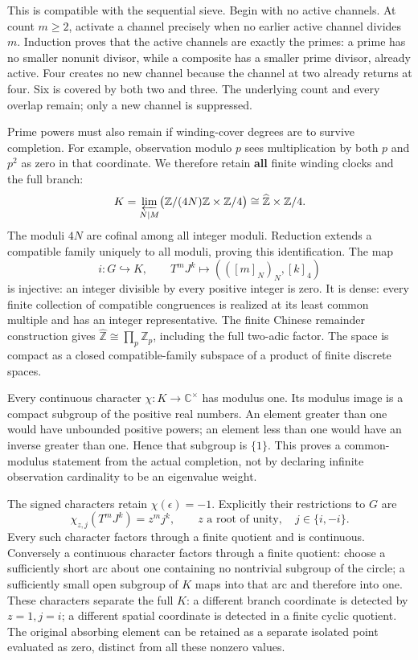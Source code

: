 \documentclass[
]{article}
\begin{document}
This is compatible with the sequential sieve. Begin with no active
channels. At count \(m\ge2\), activate a channel precisely when no
earlier active channel divides \(m\). Induction proves that the active
channels are exactly the primes: a prime has no smaller nonunit divisor,
while a composite has a smaller prime divisor, already active. Four
creates no new channel because the channel at two already returns at
four. Six is covered by both two and three. The underlying count and
every overlap remain; only a new channel is suppressed.

Prime powers must also remain if winding-cover degrees are to survive
completion. For example, observation modulo \(p\) sees multiplication by
both \(p\) and \(p^2\) as zero in that coordinate. We therefore retain
\textbf{all} finite winding clocks and the full branch: \[
K=\varprojlim_{N\mid M}\bigl(\mathbb Z/(4N)\mathbb Z\times\mathbb Z/4\bigr)
\cong\widehat{\mathbb Z}\times\mathbb Z/4.
\] The moduli \(4N\) are cofinal among all integer moduli. Reduction
extends a compatible family uniquely to all moduli, proving this
identification. The map \[
i:G\hookrightarrow K,\qquad T^mJ^k\mapsto(([m]_N)_N,[k]_4)
\] is injective: an integer divisible by every positive integer is zero.
It is dense: every finite collection of compatible congruences is
realized at its least common multiple and has an integer representative.
The finite Chinese remainder construction gives
\(\widehat{\mathbb Z}\cong\prod_p\mathbb Z_p\), including the full
two-adic factor. The space is compact as a closed compatible-family
subspace of a product of finite discrete spaces.

Every continuous character \(\chi:K\to\mathbb C^\times\) has modulus
one. Its modulus image is a compact subgroup of the positive real
numbers. An element greater than one would have unbounded positive
powers; an element less than one would have an inverse greater than one.
Hence that subgroup is \(\{1\}\). This proves a common-modulus statement
from the actual completion, not by declaring infinite observation
cardinality to be an eigenvalue weight.

The signed characters retain \(\chi(\epsilon)=-1\). Explicitly their
restrictions to \(G\) are \[
\chi_{z,j}(T^mJ^k)=z^m j^k,
\qquad z\text{ a root of unity},\quad j\in\{i,-i\}.
\] Every such character factors through a finite quotient and is
continuous. Conversely a continuous character factors through a finite
quotient: choose a sufficiently short arc about one containing no
nontrivial subgroup of the circle; a sufficiently small open subgroup of
\(K\) maps into that arc and therefore into one. These characters
separate the full \(K\): a different branch coordinate is detected by
\(z=1,j=i\); a different spatial coordinate is detected in a finite
cyclic quotient. The original absorbing element can be retained as a
separate isolated point evaluated as zero, distinct from all these
nonzero values.
\end{document}
